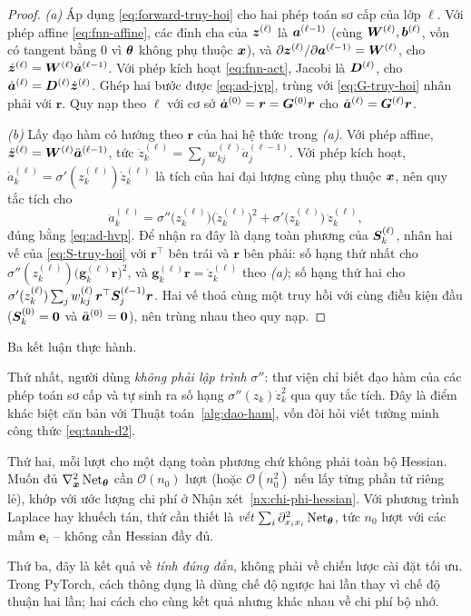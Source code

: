 \begin{proof}
\emph{(a)} Áp dụng \eqref{eq:forward-truy-hoi} cho hai phép toán sơ cấp của lớp
$\ell$. Với phép affine \eqref{eq:fnn-affine}, các đỉnh cha của $\bm{z}^{(\ell)}$ là
$\bm{a}^{(\ell-1)}$ (cùng $\bm{W}^{(\ell)},\bm{b}^{(\ell)}$, vốn có tangent bằng $0$ vì
$\bm{\theta}$ không phụ thuộc $\bm{x}$), và
$\partial\bm{z}^{(\ell)}/\partial\bm{a}^{(\ell-1)} = \bm{W}^{(\ell)}$, cho
$\dot{\bm{z}}^{(\ell)} = \bm{W}^{(\ell)}\dot{\bm{a}}^{(\ell-1)}$. Với phép kích hoạt
\eqref{eq:fnn-act}, Jacobi là $\bm{D}^{(\ell)}$, cho
$\dot{\bm{a}}^{(\ell)} = \bm{D}^{(\ell)}\dot{\bm{z}}^{(\ell)}$. Ghép hai bước được
\eqref{eq:ad-jvp}, trùng với \eqref{eq:G-truy-hoi} nhân phải với $\bm{r}$. Quy
nạp theo $\ell$ với cơ sở $\dot{\bm{a}}^{(0)} = \bm{r} = \bm{G}^{(0)}\bm{r}$ cho
$\dot{\bm{a}}^{(\ell)} = \bm{G}^{(\ell)}\bm{r}$.
 
\emph{(b)} Lấy đạo hàm có hướng theo $\bm{r}$ của hai hệ thức trong \emph{(a)}.
Với phép affine, $\ddot{\bm{z}}^{(\ell)} = \bm{W}^{(\ell)}\ddot{\bm{a}}^{(\ell-1)}$, tức
$\ddot{z}^{(\ell)}_k = \sum_j w^{(\ell)}_{kj}\ddot{a}^{(\ell-1)}_j$. Với phép
kích hoạt, $\dot{a}^{(\ell)}_k = \sigma'(z^{(\ell)}_k)\dot{z}^{(\ell)}_k$ là
tích của hai đại lượng cùng phụ thuộc $\bm{x}$, nên quy tắc tích cho
\[
\ddot{a}^{(\ell)}_k
 = \sigma''\!\big(z^{(\ell)}_k\big)\big(\dot z^{(\ell)}_k\big)^2
 + \sigma'\!\big(z^{(\ell)}_k\big)\,\ddot{z}^{(\ell)}_k ,
\]
đúng bằng \eqref{eq:ad-hvp}. Để nhận ra đây là dạng toàn phương của
$\bm{S}^{(\ell)}_k$, nhân hai vế của \eqref{eq:S-truy-hoi} với $\bm{r}^{\top}$ bên
trái và $\bm{r}$ bên phải: số hạng thứ nhất cho
$\sigma''(z^{(\ell)}_k)\big(\bm{g}^{(\ell)}_k\bm{r}\big)^2$, và
$\bm{g}^{(\ell)}_k\bm{r} = \dot z^{(\ell)}_k$ theo \emph{(a)}; số hạng thứ hai
cho $\sigma'(z^{(\ell)}_k)\sum_j w^{(\ell)}_{kj}\,
\bm{r}^{\top}\bm{S}^{(\ell-1)}_j\bm{r}$. Hai vế thoả cùng một truy hồi với cùng điều
kiện đầu ($\bm{S}^{(0)}_k = \bm{0}$ và $\ddot{\bm{a}}^{(0)} = \bm{0}$), nên trùng nhau
theo quy nạp.
\end{proof}
 
\begin{nhanxet}
Ba kết luận thực hành.
 
Thứ nhất, người dùng \emph{không phải lập trình} $\sigma''$: thư viện chỉ biết
đạo hàm của các phép toán sơ cấp và tự sinh ra số hạng $\sigma''(z_k)\dot z_k^2$
qua quy tắc tích. Đây là điểm khác biệt căn bản với
Thuật toán~\ref{alg:dao-ham}, vốn đòi hỏi viết tường minh công thức
\eqref{eq:tanh-d2}.
 
Thứ hai, mỗi lượt cho một dạng toàn phương chứ không phải toàn bộ Hessian. Muốn
đủ $\nabla^2_{\bm{x}}\operatorname{Net}_{\bm{\theta}}$ cần $\mathcal{O}(n_0)$ lượt (hoặc
$\mathcal{O}(n_0^2)$ nếu lấy từng phần tử riêng lẻ), khớp với ước lượng chi phí ở
Nhận xét~\ref{nx:chi-phi-hessian}. Với phương trình Laplace hay khuếch tán, thứ
cần thiết là \emph{vết} $\sum_i \partial^2_{x_ix_i}\operatorname{Net}_{\bm{\theta}}$, tức $n_0$
lượt với các mầm $\bm{e}_i$ -- không cần Hessian đầy đủ.
 
Thứ ba, đây là kết quả về \emph{tính đúng đắn}, không phải về chiến lược cài đặt
tối ưu. Trong PyTorch, cách thông dụng là dùng chế độ ngược hai lần thay vì chế
độ thuận hai lần; hai cách cho cùng kết quả nhưng khác nhau về chi phí bộ nhớ.
\end{nhanxet}
 
